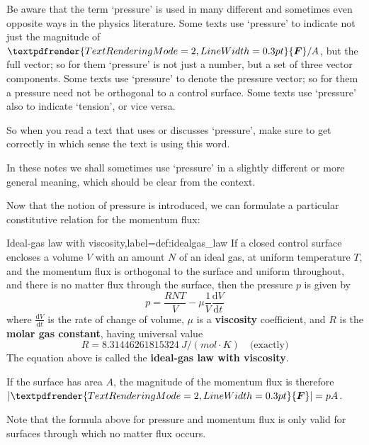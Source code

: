 \documentclass[a4paper,12pt,%
onecolumn,oneside,%
british%
]{memoir}
\providecommand{\href}[2]{#2}
\renewcommand*{\bm}[1]{\textpdfrender{TextRenderingMode=2,LineWidth=0.3pt}{\boldsymbol{#1}}}
\newcommand*{\di}{\mathrm{d}}%
\DeclarePairedDelimiter\abs{\lvert}{\rvert}
\renewcommand*{\|}[1][]{\nonscript\:#1\vert\nonscript\:\mathopen{}}
\newcommand*{\furl}[2]{\href{#1}{#2}\pagenote{\url{#1}}}
\newcommand*{\yvis}{\mu} %
\newcommand*{\yN}{N}
\newcommand*{\yF}{\bm{F}}
\newcommand*{\ypr}{p} %
\newcommand*{\yT}{T}%
\begin{document}
\begin{warning}
  Be aware that the term \enquote*{pressure} is used in many different and sometimes even opposite ways in the physics literature. Some texts use \enquote*{pressure} to indicate not just the magnitude of $\yF/A$, but the full vector; so for them \enquote*{pressure} is not just a number, but a set of three vector components. Some texts use \enquote*{pressure} to denote the pressure vector; so for them a pressure need not be orthogonal to a control surface. Some texts use \enquote*{pressure} also to indicate \enquote*{tension}, or vice versa.

  So when you read a text that uses or discusses \enquote*{pressure}, make sure to get correctly in which sense the text is using this word.

  In these notes we shall sometimes use \enquote*{pressure} in a slightly different or more general meaning, which should be clear from the context.
\end{warning}


Now that the notion of pressure is introduced, we can formulate a particular constitutive relation for the momentum flux:

\begin{definition}{Ideal-gas law with viscosity,label={def:idealgas_law}}
  If a closed control surface encloses a volume $V$ with an amount $\yN$ of an ideal gas, at uniform temperature $\yT$, and the momentum flux is orthogonal to the surface and uniform throughout, and there is no matter flux through the surface, then the pressure $\ypr$ is given by
  \begin{equation}
    \label{eq:ideal_gas_p}
    \ypr = \frac{R \yN \yT}{V}  - \yvis \frac{1}{V}\frac{\di V}{\di t}
  \end{equation}
  where $\frac{\di V}{\di t}$ is the rate of change of volume, $\yvis$ is a \textbf{viscosity} coefficient, and $R$ is the \furl{https://doi.org/10.1351/goldbook.G02579}{\textbf{molar gas constant}}, having universal value
  \begin{equation*}
    R = \qty{8.31446261815324}{J/(mol\cdot K)}\quad\text{(exactly)}
  \end{equation*}
The equation above is called the \textbf{ideal-gas law with viscosity}.

  \smallskip

  If the surface has area $A$, the magnitude of the momentum flux is therefore $\abs{\yF} = \ypr A$.

\end{definition}
Note that the formula above for pressure and momentum flux is only valid for surfaces through which no matter flux occurs.
\end{document}
